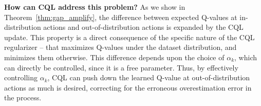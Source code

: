 
\textbf{How can CQL address this problem?} As we show in Theorem~\ref{thm:gap_amplify}, the difference between expected Q-values at in-distribution actions and out-of-distribution actions is expanded by the CQL update. This property is a direct consequence of the specific nature of the CQL regularizer -- that maximizes Q-values under the dataset distribution, and minimizes them otherwise. This difference depends upon the choice of $\alpha_k$, which can directly be controlled, since it is a free parameter. Thus, by effectively controlling $\alpha_k$, CQL can push down the learned Q-value at out-of-distribution actions as much is desired, correcting for the erroneous overestimation error in the process.  



